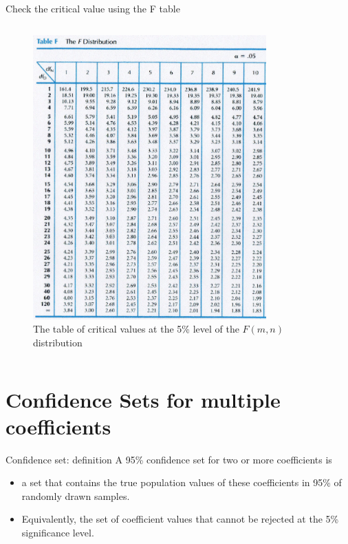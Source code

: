 \documentclass[presentation,10pt]{beamer}
\begin{document}
\begin{frame}[label={sec:org4c71e80}]{Check the critical value using the F table}
\begin{columns}
\begin{column}{0.5\columnwidth}
\begin{figure}[htbp]
\centering
\includegraphics[width=0.8\textwidth]{img/Ftrunc.jpg}
\caption{The table of critical values at the 5\% level of the \(F(m, n)\) distribution}
\end{figure}
\end{column}
\end{columns}
\end{frame}

\section{Confidence Sets for multiple coefficients}
\label{sec:org1ee8fa0}
\setcounter{tocdepth}{1}
\tableofcontents[currentsection]
\begin{frame}[label={sec:org8579a42}]{Confidence set: definition}
A 95\% \alert{confidence set} for two or more coefficients is

\begin{itemize}
\item a set that contains the true population values of these coefficients
in 95\% of randomly drawn samples.

\item Equivalently, the set of coefficient values that cannot be rejected
at the 5\% significance level.
\end{itemize}
\end{frame}
\end{document}
